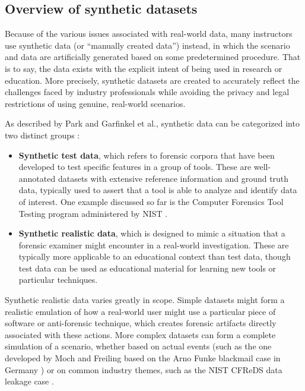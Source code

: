 \documentclass[letterpaper,12pt]{report}
\def\tightlist{}
\begin{document}
\subsection{Overview of synthetic
datasets}\label{overview-of-synthetic-datasets}

Because of the various issues associated with real-world data, many
instructors use synthetic data (or ``manually created data'') instead,
in which the scenario and data are artificially generated based on some
predetermined procedure. That is to say, the data exists with the
explicit intent of being used in research or education. More precisely,
synthetic datasets are created to accurately reflect the challenges
faced by industry professionals while avoiding the privacy and legal
restrictions of using genuine, real-world scenarios.

As described by Park and Garfinkel et al., synthetic data can be
categorized into two distinct groups
\cite{garfinkelBringingScienceDigital2009,parkTREDEVMPOPCultivating2018}:

\begin{itemize}
\tightlist
\item
  \textbf{Synthetic test data}, which refers to forensic corpora that
  have been developed to test specific features in a group of tools.
  These are well-annotated datasets with extensive reference information
  and ground truth data, typically used to assert that a tool is able to
  analyze and identify data of interest. One example discussed so far is
  the Computer Forensics Tool Testing program administered by NIST
  \cite{nationalinstituteofstandardsandtechnologyComputerForensicsTool2017}.
\item
  \textbf{Synthetic realistic data}, which is designed to mimic a
  situation that a forensic examiner might encounter in a real-world
  investigation. These are typically more applicable to an educational
  context than test data, though test data can be used as educational
  material for learning new tools or particular techniques.
\end{itemize}

Synthetic realistic data varies greatly in scope. Simple datasets might
form a realistic emulation of how a real-world user might use a
particular piece of software or anti-forensic technique, which creates
forensic artifacts directly associated with these actions. More complex
datasets can form a complete simulation of a scenario, whether based on
actual events (such as the one developed by Moch and Freiling based on
the Arno Funke blackmail case in Germany
\cite{mochForensicImageGenerator2009}) or on common industry themes,
such as the NIST CFReDS data leakage case
\cite{nationalinstituteofstandardsandtechnologyCFReDSDataLeakage}.
\end{document}
